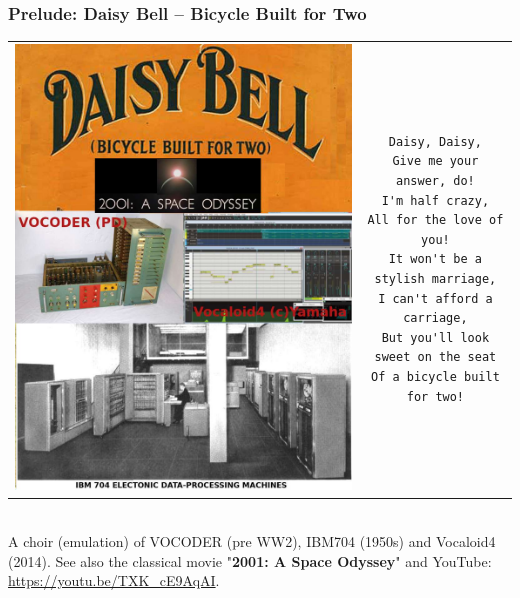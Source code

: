 \documentclass[xcolor=table, notheorems, hyperref={pdfpagelabels=false}]{beamer}
\begin{document}
\begin{frame}[fragile]
\frametitle{Prelude: Daisy Bell -- Bicycle Built for Two}
\begin{tabular}{cc}
\begin{minipage}{45mm}
\vspace{1pt}
\includegraphics[width=0.99\linewidth]{os-daisybell}
\end{minipage}
&
\begin{minipage}{65mm}
\vspace{1pt}
\begin{verbatim}
Daisy, Daisy,
Give me your answer, do!
I'm half crazy,
All for the love of you!
It won't be a stylish marriage,
I can't afford a carriage,
But you'll look sweet on the seat
Of a bicycle built for two!
\end{verbatim}
\end{minipage}
\\
\end{tabular}
\\[5mm]

A choir (emulation) of VOCODER (pre WW2), IBM704 (1950s) and  Vocaloid4 (2014).
See also the classical movie "\textbf{2001: A Space Odyssey}" and YouTube: \url{https://youtu.be/TXK_cE9AqAI}.
\end{frame}
\end{document}
